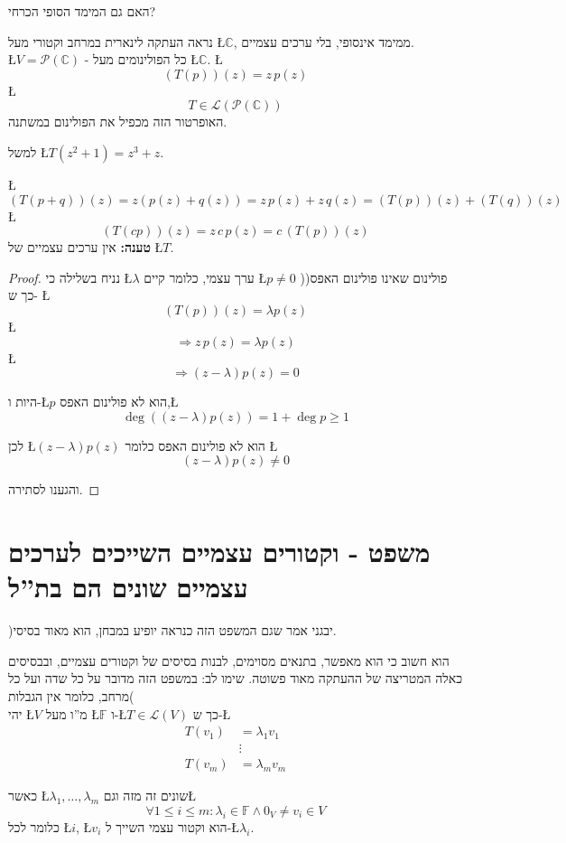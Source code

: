 \documentclass[english,hebrew]{article}
\theoremstyle{plain}
\begin{document}
האם גם המימד הסופי הכרחי?

נראה העתקה לינארית במרחב וקטורי מעל \L{$\mathbb{C}$}, ממימד אינסופי,
בלי ערכים עצמיים.\\

\L{$V=\mathcal{P}(\mathbb{C})$} - כל הפולינומים מעל \L{$\mathbb{C}$}.
\L{%
\[
(T(p))(z)=z\,p(z)
\]
}%
\L{%
\[
T\in\mathcal{L}(\mathcal{P}(\mathbb{C}))
\]
}%
האופרטור הזה מכפיל את הפולינום במשתנה.

למשל \L{$T\left(z^{2}+1\right)=z^{3}+z$}.

\L{%
\[
(T(p+q))(z)=z(p(z)+q(z))=z\,p(z)+z\,q(z)=(T(p))(z)+(T(q))(z)
\]
}%
\L{%
\[
(T(cp))(z)=z\,c\,p(z)=c\,(T(p))(z)
\]
}%
\textbf{טענה:} אין ערכים עצמיים של \L{$T$}.
\begin{proof}
נניח בשלילה כי \L{$\lambda$} ערך עצמי, כלומר קיים \L{$p\neq0$} )פולינום
שאינו פולינום האפס( כך ש- \L{%
\[
(T(p))(z)=\lambda p(z)
\]
}%
\L{%
\[
\Rightarrow z\,p(z)=\lambda p(z)
\]
}%
\L{%
\[
\Rightarrow(z-\lambda)p(z)=0
\]
}%

היות ו-\L{$p$} הוא לא פולינום האפס,\L{%
\[
\deg((z-\lambda)p(z))=1+\deg p\geq1
\]
}%

לכן \L{$(z-\lambda)p(z)$} הוא לא פולינום האפס כלומר \L{%
\[
(z-\lambda)p(z)\ne0
\]
}%

והגענו לסתירה.
\end{proof}

\section{משפט - וקטורים עצמיים השייכים לערכים עצמיים שונים הם בת\textquotedblright ל}

)יבגני אמר שגם המשפט הזה כנראה יופיע במבחן, הוא מאוד בסיסי.

הוא חשוב כי הוא מאפשר, בתנאים מסוימים, לבנות בסיסים של וקטורים עצמיים,
ובבסיסים כאלה המטריצה של ההעתקה מאוד פשוטה. שימו לב: במשפט הזה מדובר
על כל שדה ועל כל מרחב, כלומר אין הגבלות(\\

יהי \L{$V$} מ\textquotedblright ו מעל \L{$\mathbb{F}$} ו-\L{$T\in\mathcal{L}(V)$}
כך ש-\L{%
\begin{align*}
T(v_{1}) & =\lambda_{1}v_{1}\\
 & \vdots\\
T(v_{m}) & =\lambda_{m}v_{m}
\end{align*}
}%

כאשר \L{$\lambda_{1},\dots,\lambda_{m}$} שונים זה מזה וגם\L{%
\[
\forall1\le i\le m:\lambda_{i}\in\mathbb{F}\wedge0_{V}\ne v_{i}\in V
\]
}%
כלומר לכל \L{$i$}, \L{$v_{i}$} הוא וקטור עצמי השייך ל-\L{$\lambda_{i}$}.\\
\end{document}
